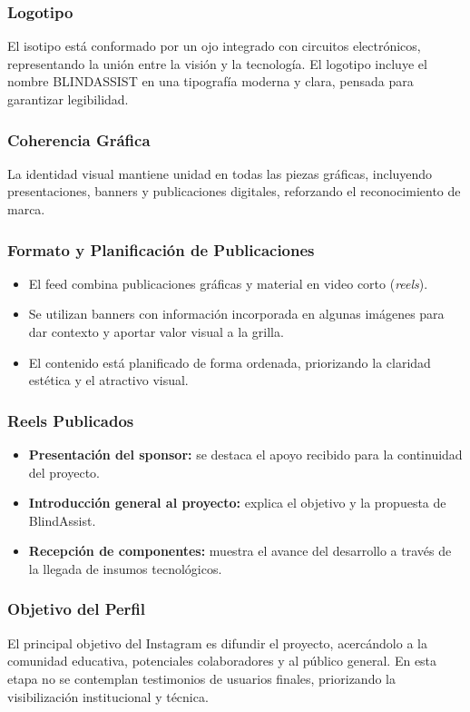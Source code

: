 \documentclass[12pt,a4paper]{article}
\begin{document}
\subsubsection{Logotipo}
El isotipo está conformado por un ojo integrado con circuitos electrónicos, representando la unión entre la visión y la tecnología.  
El logotipo incluye el nombre BLINDASSIST en una tipografía moderna y clara, pensada para garantizar legibilidad.

\subsubsection{Coherencia Gráfica}
La identidad visual mantiene unidad en todas las piezas gráficas, incluyendo presentaciones, banners y publicaciones digitales, reforzando el reconocimiento de marca.

\subsubsection{Formato y Planificación de Publicaciones}
\begin{itemize}
    \item El feed combina publicaciones gráficas y material en video corto (\textit{reels}).
    \item Se utilizan banners con información incorporada en algunas imágenes para dar contexto y aportar valor visual a la grilla.
    \item El contenido está planificado de forma ordenada, priorizando la claridad estética y el atractivo visual.
\end{itemize}

\subsubsection{Reels Publicados}
\begin{itemize}
    \item \textbf{Presentación del sponsor:} se destaca el apoyo recibido para la continuidad del proyecto.
    \item \textbf{Introducción general al proyecto:} explica el objetivo y la propuesta de BlindAssist.
    \item \textbf{Recepción de componentes:} muestra el avance del desarrollo a través de la llegada de insumos tecnológicos.
\end{itemize}

\subsubsection{Objetivo del Perfil}
El principal objetivo del Instagram es difundir el proyecto, acercándolo a la comunidad educativa, potenciales colaboradores y al público general.  
En esta etapa no se contemplan testimonios de usuarios finales, priorizando la visibilización institucional y técnica.
\end{document}
